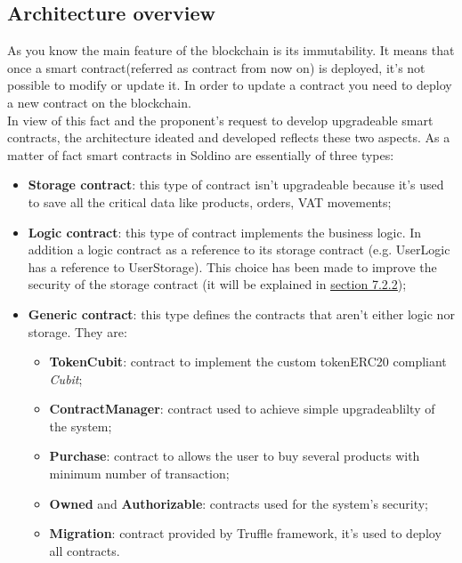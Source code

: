 \subsection{Architecture overview}
As you know the main feature of the blockchain is its immutability. It means that once a smart contract\glosp (referred as contract from now on) is 
deployed, it's not possible to modify or update it. In order to update a contract you need to deploy 
a new contract on the blockchain.\\
In view of this fact and the proponent's request to develop upgradeable smart contracts, the architecture ideated and developed reflects these two aspects. As a matter of fact smart contracts in Soldino
are essentially of three types:
\begin{itemize}
	\item\textbf{Storage contract}: this type of contract isn't upgradeable because it's used
		to save all the critical data like products, orders, VAT movements;
	\item\textbf{Logic contract}: this type of contract implements the business logic. In addition
	a logic contract as a reference to its storage contract (e.g. UserLogic has a reference to UserStorage). This choice has been made to improve the security of the storage contract (it will be explained in \hyperlink{st}{\underline{section 7.2.2}});
	\item\textbf{Generic contract}: this type defines the contracts that aren't either logic nor storage.
	They are:
	\begin{itemize}
		\item\textbf{TokenCubit}: contract to implement the custom token\glosp ERC20 compliant \textit{Cubit};
		\item\textbf{ContractManager}: contract used to achieve simple upgradeablilty of the system;
		\item\textbf{Purchase}: contract to allows the user to buy several products with minimum number of transaction;
		\item\textbf{Owned} and \textbf{Authorizable}: contracts used for the system's security;
		\item\textbf{Migration}: contract provided by Truffle framework\glo, it's used to deploy all contracts. 
	\end{itemize}
\end{itemize}

